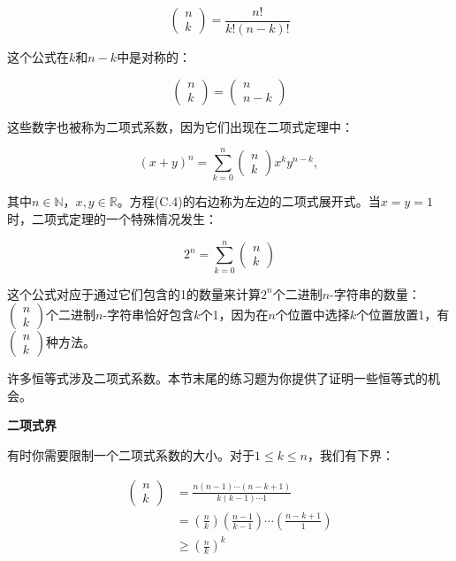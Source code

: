 \documentclass[lang=cn,newtx,10pt,scheme=chinese]{elegantbook}
\begin{document}
$$
\left(\begin{array}{l}
n \\
k
\end{array}\right)=\frac{n !}{k !(n-k) !}
$$

这个公式在$k$和$n-k$中是对称的：

$$
\left(\begin{array}{l}
n \\
k
\end{array}\right)=\left(\begin{array}{c}
n \\
n-k
\end{array}\right)
$$

这些数字也被称为二项式系数，因为它们出现在二项式定理中：

$$
(x+y)^n=\sum_{k=0}^n\left(\begin{array}{l}
n \\
k
\end{array}\right) x^k y^{n-k} \text {, }
$$

其中$n \in \mathbb{N}$，$x, y \in \mathbb{R}$。方程(C.4)的右边称为左边的二项式展开式。当$x=y=1$时，二项式定理的一个特殊情况发生：

$$
2^n=\sum_{k=0}^n\left(\begin{array}{l}
n \\
k
\end{array}\right)
$$

这个公式对应于通过它们包含的1的数量来计算$2^n$个二进制$n$-字符串的数量：$\left(\begin{array}{l}n \\ k\end{array}\right)$个二进制$n$-字符串恰好包含$k$个1，因为在$n$个位置中选择$k$个位置放置1，有$\left(\begin{array}{l}n \\ k\end{array}\right)$种方法。

许多恒等式涉及二项式系数。本节末尾的练习题为你提供了证明一些恒等式的机会。

\textbf{二项式界}

有时你需要限制一个二项式系数的大小。对于$1 \leq k \leq n$，我们有下界：

$$
\begin{aligned}
\left(\begin{array}{l}
n \\
k
\end{array}\right) & =\frac{n(n-1) \cdots(n-k+1)}{k(k-1) \cdots 1} \\
& =\left(\frac{n}{k}\right)\left(\frac{n-1}{k-1}\right) \cdots\left(\frac{n-k+1}{1}\right) \\
& \geq\left(\frac{n}{k}\right)^k
\end{aligned}
$$
\end{document}
